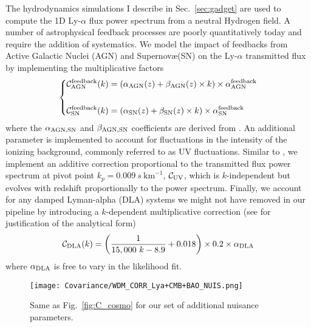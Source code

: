 The hydrodynamics simulations I describe in Sec.~\ref{sec:gadget} are used to compute the 1D Ly-$\alpha$ flux power spectrum from a neutral Hydrogen field. A number of astrophysical feedback processes are poorly quantitatively today and require the addition of systematics. We model the impact of feedbacks from Active Galactic Nuclei (AGN) and Supernov\ae (SN) on the Ly-$\alpha$ transmitted flux by implementing the multiplicative factors
\begin{equation}
\label{eq:Nuis2}
\left\{
\begin{split}
& \mathcal{C}^{\rm{feedback}}_{\rm{AGN}} (k) = \left( \alpha_{\rm{AGN}}(z) + \beta_{\rm{AGN}}(z) \times k \right) \times \alpha^{\rm{feedback}}_{\rm{AGN}} \\
\\
& \mathcal{C}^{\rm{feedback}}_{\rm{SN}} (k) = \left( \alpha_{\rm{SN}}(z) + \beta_{\rm{SN}}(z) \times k \right) \times \alpha^{\rm{feedback}}_{\rm{SN}}
\end{split}
\right.
\end{equation} where the $\alpha_{\rm{AGN, SN}}$ and $\beta_{\rm{AGN, SN}}$ coefficients are derived from \cite{Feedbacks}. An additional parameter is implemented to account for fluctuations in the intensity of the ionizing background, commonly referred to as UV fluctuations. Similar to \cite{UVbackground}, we implement an additive correction proportional to the transmitted flux power spectrum at  pivot point $k_{p} = 0.009 ~s~ \mathrm{km}^{-1}$, $\mathcal{C}_{\rm{UV}}$, which is $k$-independent but evolves with redshift proportionally to the power spectrum. Finally, we account for any damped Lyman-alpha (DLA) systems we might not have removed in our pipeline by introducing a $k$-dependent multiplicative correction (see \cite{McDonald2005} for justification of the analytical form)
\begin{equation}
\label{eq:Nuis3}
\mathcal{C}_{\rm DLA}(k) = \left( \frac{1}{15,000 ~k - 8.9} + 0.018 \right) \times 0.2 \times \alpha_{\rm{DLA}}
\end{equation} where $\alpha_{\rm{DLA}}$ is free to vary in the likelihood fit. 

\begin{figure}
\begin{center}
\texttt{[image: Covariance/WDM\_CORR\_Lya+CMB+BAO\_NUIS.png]}
\caption{Same as Fig.~\ref{fig:C_cosmo} for our set of additional nuisance parameters.}
\label{fig:C_nuis}
\end{center}
\end{figure}


